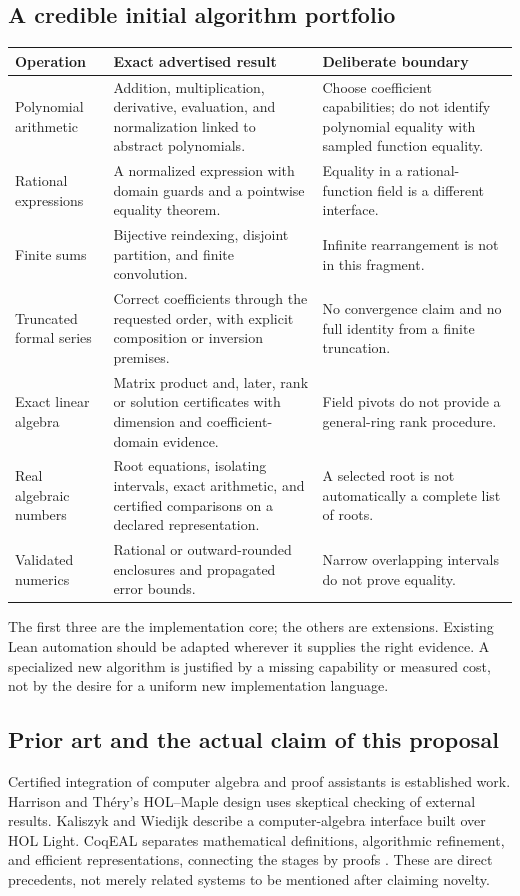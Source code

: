 \documentclass[11pt,letterpaper]{article}
\numberwithin{equation}{section}
\begin{document}
\subsection{A credible initial algorithm portfolio}
\begin{longtable}{@{}P{.23\textwidth}P{.38\textwidth}P{.31\textwidth}@{}}
\toprule
Operation & Exact advertised result & Deliberate boundary\\
\midrule
\endhead
Polynomial arithmetic & Addition, multiplication, derivative, evaluation, and
normalization linked to abstract polynomials. & Choose coefficient capabilities;
do not identify polynomial equality with sampled function equality.\\
Rational expressions & A normalized expression with domain guards and a
pointwise equality theorem. & Equality in a rational-function field is a
different interface.\\
Finite sums & Bijective reindexing, disjoint partition, and finite convolution.
& Infinite rearrangement is not in this fragment.\\
Truncated formal series & Correct coefficients through the requested order,
with explicit composition or inversion premises. & No convergence claim and no
full identity from a finite truncation.\\
Exact linear algebra & Matrix product and, later, rank or solution certificates
with dimension and coefficient-domain evidence. & Field pivots do not provide a
general-ring rank procedure.\\
Real algebraic numbers & Root equations, isolating intervals, exact arithmetic,
and certified comparisons on a declared representation. & A selected root is
not automatically a complete list of roots.\\
Validated numerics & Rational or outward-rounded enclosures and propagated
error bounds. & Narrow overlapping intervals do not prove equality.\\
\bottomrule
\end{longtable}

The first three are the implementation core; the others are extensions. Existing
Lean automation should be adapted wherever it supplies the right evidence. A
specialized new algorithm is justified by a missing capability or measured cost,
not by the desire for a uniform new implementation language.

\subsection{Prior art and the actual claim of this proposal}
Certified integration of computer algebra and proof assistants is established
work. Harrison and Th\'ery's HOL--Maple design uses skeptical checking of external
results. Kaliszyk and Wiedijk describe a computer-algebra interface built over
HOL Light. CoqEAL separates mathematical definitions, algorithmic refinement,
and efficient representations, connecting the stages by proofs
\cite{harrison,holcas,coqeal}. These are direct precedents, not merely related
systems to be mentioned after claiming novelty.
\end{document}
